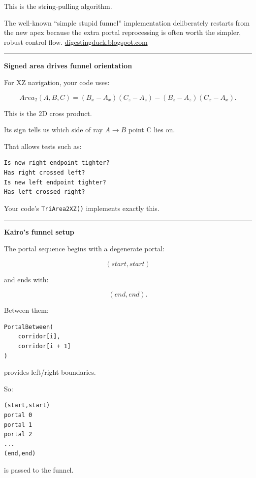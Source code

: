 This is the string-pulling algorithm.

The well-known ``simple stupid funnel'' implementation deliberately restarts from the new apex because the extra portal reprocessing is often worth the simpler, robust control flow. \href{https://digestingduck.blogspot.com/2010/03/simple-stupid-funnel-algorithm.html?utm_source=chatgpt.com}{digestingduck.blogspot.com}

\begin{center}\rule{0.5\linewidth}{0.5pt}\end{center}

\textbf{Signed area drives funnel orientation}

For XZ navigation, your code uses:

\[
Area_2(A,B,C)
=
(B_x-A_x)(C_z-A_z)
-
(B_z-A_z)(C_x-A_x).
\]

This is the 2D cross product.

Its sign tells us which side of ray \(A\rightarrow B\) point C lies on.

That allows tests such as:

\begin{verbatim}
Is new right endpoint tighter?
Has right crossed left?
Is new left endpoint tighter?
Has left crossed right?
\end{verbatim}

Your code's \texttt{TriArea2XZ()} implements exactly this.

\begin{center}\rule{0.5\linewidth}{0.5pt}\end{center}

\textbf{Kairo's funnel setup}

The portal sequence begins with a degenerate portal:

\[
(start,start)
\]

and ends with:

\[
(end,end).
\]

Between them:

\begin{verbatim}
PortalBetween(
    corridor[i],
    corridor[i + 1]
)
\end{verbatim}

provides left/right boundaries.

So:

\begin{verbatim}
(start,start)
portal 0
portal 1
portal 2
...
(end,end)
\end{verbatim}

is passed to the funnel.

